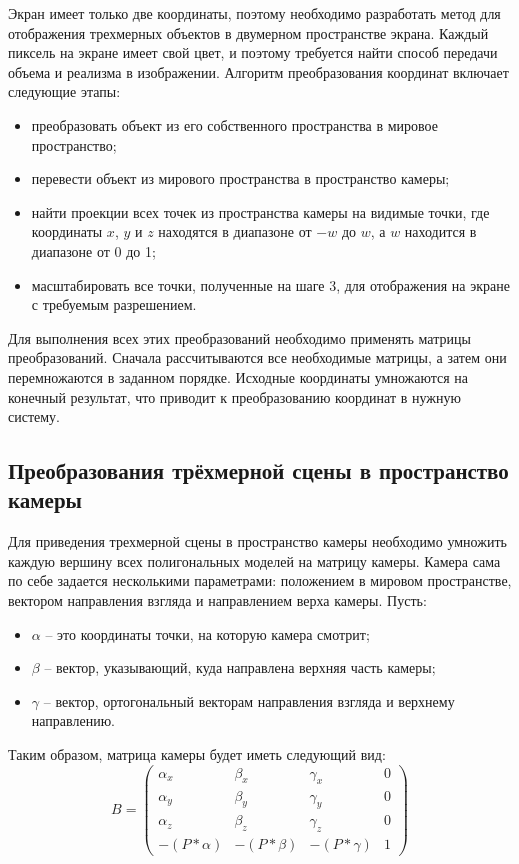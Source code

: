 Экран имеет только две координаты, поэтому необходимо разработать метод для отображения трехмерных объектов в двумерном пространстве экрана. 
Каждый пиксель на экране имеет свой цвет, и поэтому требуется найти способ передачи объема и реализма в изображении. 
Алгоритм преобразования координат включает следующие этапы:
\begin{itemize}
	\item преобразовать объект из его собственного пространства в мировое пространство;
	\item перевести объект из мирового пространства в пространство камеры;
	\item найти проекции всех точек из пространства камеры на видимые точки, где координаты $x$, $y$ и $z$ находятся в диапазоне от $-w$ до $w$, а $w$ находится в диапазоне от 0 до 1;
	\item масштабировать все точки, полученные на шаге 3, для отображения на экране с требуемым разрешением.
\end{itemize}

Для выполнения всех этих преобразований необходимо применять матрицы преобразований. 
Сначала рассчитываются все необходимые матрицы, а затем они перемножаются в заданном порядке. 
Исходные координаты умножаются на конечный результат, что приводит к преобразованию координат в нужную систему.

\subsection{Преобразования трёхмерной сцены в пространство камеры}

Для приведения трехмерной сцены в пространство камеры необходимо умножить каждую вершину всех полигональных моделей на матрицу камеры. 
Камера сама по себе задается несколькими параметрами: положением в мировом пространстве, вектором направления взгляда и направлением верха камеры. Пусть:
\begin{itemize}
	\item $\alpha$ -- это координаты точки, на которую камера смотрит;
	\item $\beta$ -- вектор, указывающий, куда направлена верхняя часть камеры;
	\item $\gamma$ --  вектор, ортогональный векторам направления взгляда и верхнему направлению.
\end{itemize}
Таким образом, матрица камеры будет иметь следующий вид:
\begin{equation}
	B = \left(
	\begin{array}{cccc}
		\alpha_x & \beta_x & \gamma_x & 0\\
		\alpha_y & \beta_y & \gamma_y & 0 \\
		\alpha_z & \beta_z & \gamma_z & 0 \\
		-(P*\alpha) & -(P*\beta) &-(P*\gamma) & 1
	\end{array}
	\right) 
\end{equation}

